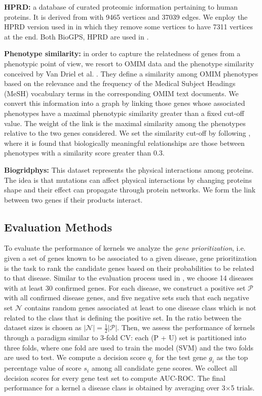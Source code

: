 \documentclass[runningheads,a4paper]{llncs}
\begin{document}
\textbf{HPRD:} a database of curated proteomic information pertaining to human proteins. It is derived from \cite{jour5} with 9465 vertices and 37039 edges. We enploy the HPRD version used in \cite{jour6} in which they remove some vertices to have 7311 vertices at the end. Both BioGPS, HPRD are used in \cite{proceeding3}.

\textbf{Phenotype similarity:} in order to capture the relatedness of genes from a phenotypic point of view, we resort to OMIM \cite{jour4} data and the phenotype similarity conceived by Van Driel et al. \cite{jour5}. They define a similarity among OMIM phenotypes based on the relevance and the frequency of the Medical Subject Headings (MeSH) vocabulary terms in the corresponding OMIM text documents. We convert this information into a graph by linking those genes whose associated phenotypes have a maximal phenotypic similarity greater than a fixed cut-off value. The weight of the link is the maximal similarity among the phenotypes relative to the two genes considered. We set the similarity cut-off by following \cite{jour5}, where it is found that biologically meaningful relationships are those between phenotypes with a similarity score greater than 0.3.

\textbf{Biogridphys:} This dataset represents the physical interactions among proteins. The idea is that mutations can affect physical interactions by changing proteins shape and their effect can propagate through protein networks. We form the link between two genes if their products interact.

\subsection{Evaluation Methods}
To evaluate the performance of kernels we analyze the {\em gene prioritization}, i.e. given a set of genes known to be associated to a given disease, gene prioritization is the task to rank the candidate genes based on their probabilities to be related to that disease. Similar to the evaluation process used in \cite{proceeding3}, we choose 14 diseases with at least 30 confirmed genes. For each disease, we construct a positive set $\mathcal{P}$ with all confirmed disease genes, and five negative sets such that each negative set $\mathcal{N}$ contains random genes associated at least to one disease class which is not related to the class that is defining the positive set. In \cite{proceeding3} the ratio between the dataset sizes is chosen as $\vert \mathcal{N} \vert = \frac{1}{2} \vert \mathcal{P} \vert$. Then, we assess the performance of kernels through a paradigm similar to 3-fold CV: each (P + U) set is partitioned into three folds, where one fold are used to train the model (SVM) and the two folds are used to test. We compute a decision score $q_i$ for the test gene $g_i$ as the top percentage value of score $s_i$ among all candidate gene scores. We collect all decision scores for every gene test set to compute AUC-ROC. The final performance for a kernel a disease class is obtained by averaging over 3$\times$5 trials.
\end{document}
